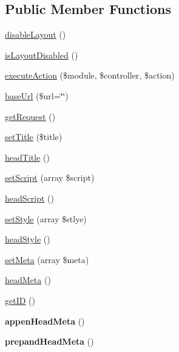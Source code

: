 \subsection*{Public Member Functions}
\begin{DoxyCompactItemize}
\item 
\hyperlink{class_anemo_1_1_layout_a0f7b1a85d3ece5ad8ee59498b1df8885}{disableLayout} ()
\item 
\hyperlink{class_anemo_1_1_layout_a164553d8a63d910d7ded250b552da1a8}{isLayoutDisabled} ()
\item 
\hyperlink{class_anemo_1_1_layout_a6e63e1b67e3b93006a31cd04a3432712}{executeAction} (\$module, \$controller, \$action)
\item 
\hyperlink{class_anemo_1_1_layout_ad011c3639122bebffc3065dfda195ba8}{baseUrl} (\$url=\char`\"{}\char`\"{})
\item 
\hyperlink{class_anemo_1_1_layout_adf1a35ad20e475c59cc0967d5764aa22}{getRequest} ()
\item 
\hyperlink{class_anemo_1_1_layout_a884ba9bb0d54bde7839e798db7964476}{setTitle} (\$title)
\item 
\hyperlink{class_anemo_1_1_layout_af19950806fc8cf077d7a09acf18f570f}{headTitle} ()
\item 
\hyperlink{class_anemo_1_1_layout_ae5a973c91e04a0baf14d297057b9a17b}{setScript} (array \$script)
\item 
\hyperlink{class_anemo_1_1_layout_a9151762490b475f90d8c9b4c68772e50}{headScript} ()
\item 
\hyperlink{class_anemo_1_1_layout_a0a2ff74e57757ad470742640390d39a9}{setStyle} (array \$stlye)
\item 
\hyperlink{class_anemo_1_1_layout_aa68c38c2608f5a75f72bc1e920610822}{headStyle} ()
\item 
\hyperlink{class_anemo_1_1_layout_aad0f01a4e2ef28511943c7b0573aa1e3}{setMeta} (array \$meta)
\item 
\hyperlink{class_anemo_1_1_layout_a050b96b5e70356b57389c0f5aca3939b}{headMeta} ()
\item 
\hyperlink{class_anemo_1_1_layout_a30dd7fff4fec7a39f9be9d27d4b22a59}{getID} ()
\item 
\hypertarget{class_anemo_1_1_layout_aa2a4ea5813122645952c2328ddf6ea87}{
{\bfseries appenHeadMeta} ()}
\label{class_anemo_1_1_layout_aa2a4ea5813122645952c2328ddf6ea87}

\item 
\hypertarget{class_anemo_1_1_layout_a8b12dbf9b7e86b3b2045326dbd3a9f27}{
{\bfseries prepandHeadMeta} ()}
\label{class_anemo_1_1_layout_a8b12dbf9b7e86b3b2045326dbd3a9f27}


\end{DoxyCompactItemize}
